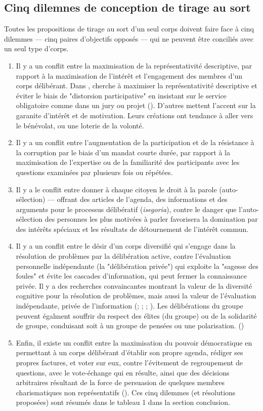 \subsection{Cinq dilemnes de conception de tirage au sort}
Toutes les propositions de tirage au sort d'un seul corps doivent faire
face à cinq dilemmes --- cinq paires d'objectifs opposés --- qui ne
peuvent être conciliés avec un seul type d'corps.
\begin{enumerate}
\item Il y a un conflit entre la maximisation de la représentativité
descriptive, par rapport à la maximisation de l'intérêt et
l'engagement des membres d'un corps délibérant. Dans
\autocite{leib04}, \autocite{leib04} cherche à maximiser la
représentativité descriptive et éviter le biais de "distorsion
participative" en insistant sur le service obligatoire comme dans un
jury ou projet (\cite{leib04}). D'autres mettent l'accent sur la
garanite d'intérêt et de motivation. Leurs créations ont tendance à
aller vers le bénévolat, ou une loterie de la volonté.
\item Il y a un conflit entre l'augmentation de la participation et de la
résistance à la corruption par le biais d'un mandat courte durée, par
rapport à la maximisation de l'expertise ou de la familiarité des
participants avec les questions examinées par plusieurs fois ou
répétées.
\item Il y a le conflit entre donner à chaque citoyen le droit à la
parole (auto-sélection) --- offrant des articles de l'agenda,
des informations et des arguments pour le processus délibératif
(\emph{isegoria}), contre le danger que l'auto-sélection des personnes
les plus motivées à parler favorisera la domination par des intérêts
spéciaux et les résultats de détournement de l'intérêt commun.
\item Il y a un conflit entre le désir d'un corps diversifié qui
s'engage dans la résolution de problèmes par la délibération active,
contre l'évaluation personnelle indépendante (la "délibération
privée") qui exploite la "sagesse des foules" et évite les cascades
d'information, qui peut fermer la connaissance privée. Il y a des
recherches convaincantes montrant la valeur de la diversité cognitive
pour la résolution de problèmes, mais aussi la valeur de l'évaluation
indépendante, privée de l'information (\cite{page07};
\cite{landemore12}; \cite{lorenz11};
\cite{surowiecki04}). Les délibérations du groupe peuvent égalment
souffrir du respect des élites (du groupe)  ou de la solidarité de
groupe, conduisant soit à un groupe de pensées ou une
polarisation. (\cite{sunstein06})  
\item Enfin, il existe un conflit entre la maximisation du pouvoir
démocratique en permettant à un corps délibérant d'établir son propre
agenda, rédiger ses propres factures, et voter sur eux, contre
l'évitement de regroupement de questions, avec le vote-échange qui en
résulte, ainsi que des décisions arbitraires résultant de la force de
persuasion de quelques membres charismatiques non représentatifs
(\cite{sutherland08}). Ces cinq dilemmes (et résolutions
proposées) sont résumés dans le tableau 1 dans la section conclusion.
\end{enumerate}




